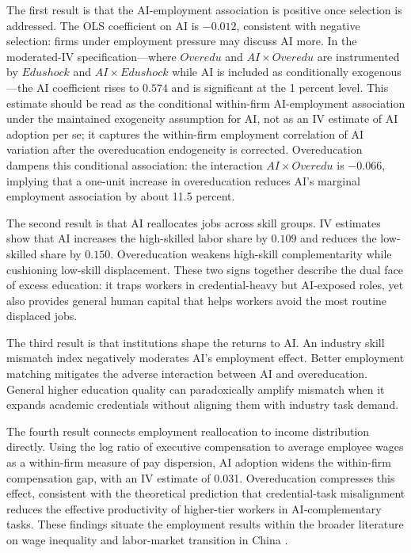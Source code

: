 \documentclass[12pt,a4paper]{article}
\theoremstyle{predstyle}
\theoremstyle{plain}
\newcommand{\Overedu}{\mathit{Overedu}}
\begin{document}
The first result is that the AI-employment association is positive once selection is addressed. The OLS coefficient on AI is \(-0.012\), consistent with negative selection: firms under employment pressure may discuss AI more. In the moderated-IV specification---where \(\Overedu\) and \(AI \times \Overedu\) are instrumented by \(Edushock\) and \(AI \times Edushock\) while AI is included as conditionally exogenous---the AI coefficient rises to \(0.574\) and is significant at the 1 percent level. This estimate should be read as the conditional within-firm AI-employment association under the maintained exogeneity assumption for AI, not as an IV estimate of AI adoption per se; it captures the within-firm employment correlation of AI variation after the overeducation endogeneity is corrected. Overeducation dampens this conditional association: the interaction \(AI \times \Overedu\) is \(-0.066\), implying that a one-unit increase in overeducation reduces AI's marginal employment association by about 11.5 percent.

The second result is that AI reallocates jobs across skill groups. IV estimates show that AI increases the high-skilled labor share by \(0.109\) and reduces the low-skilled share by \(0.150\). Overeducation weakens high-skill complementarity while cushioning low-skill displacement. These two signs together describe the dual face of excess education: it traps workers in credential-heavy but AI-exposed roles, yet also provides general human capital that helps workers avoid the most routine displaced jobs.

The third result is that institutions shape the returns to AI. An industry skill mismatch index negatively moderates AI's employment effect. Better employment matching mitigates the adverse interaction between AI and overeducation. General higher education quality can paradoxically amplify mismatch when it expands academic credentials without aligning them with industry task demand.

The fourth result connects employment reallocation to income distribution directly. Using the log ratio of executive compensation to average employee wages as a within-firm measure of pay dispersion, AI adoption widens the within-firm compensation gap, with an IV estimate of 0.031. Overeducation compresses this effect, consistent with the theoretical prediction that credential-task misalignment reduces the effective productivity of higher-tier workers in AI-complementary tasks. These findings situate the employment results within the broader literature on wage inequality and labor-market transition in China \citep{knight2003, knight2014}.
\end{document}
